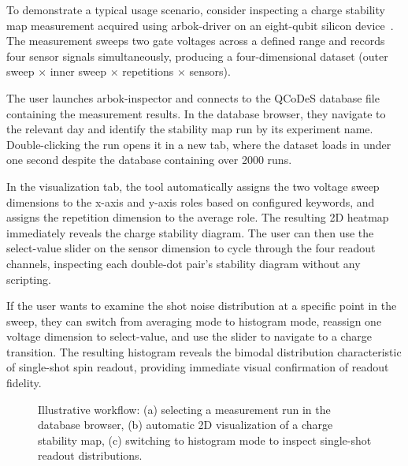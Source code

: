 To demonstrate a typical usage scenario, consider inspecting a charge stability map measurement acquired using arbok-driver on an eight-qubit silicon device~\cite{nickl2025eight}.
The measurement sweeps two gate voltages across a defined range and records four sensor signals simultaneously, producing a four-dimensional dataset (outer sweep $\times$ inner sweep $\times$ repetitions $\times$ sensors).

The user launches arbok-inspector and connects to the QCoDeS database file containing the measurement results.
In the database browser, they navigate to the relevant day and identify the stability map run by its experiment name.
Double-clicking the run opens it in a new tab, where the dataset loads in under one second despite the database containing over 2000 runs.

In the visualization tab, the tool automatically assigns the two voltage sweep dimensions to the x-axis and y-axis roles based on configured keywords, and assigns the repetition dimension to the average role.
The resulting 2D heatmap immediately reveals the charge stability diagram.
The user can then use the select-value slider on the sensor dimension to cycle through the four readout channels, inspecting each double-dot pair's stability diagram without any scripting.

If the user wants to examine the shot noise distribution at a specific point in the sweep, they can switch from averaging mode to histogram mode, reassign one voltage dimension to select-value, and use the slider to navigate to a charge transition.
The resulting histogram reveals the bimodal distribution characteristic of single-shot spin readout, providing immediate visual confirmation of readout fidelity.


\begin{figure}[H]
\caption{Illustrative workflow: (a) selecting a measurement run in the database browser, (b) automatic 2D visualization of a charge stability map, (c) switching to histogram mode to inspect single-shot readout distributions.}
\label{fig:inspector_workflow}
\end{figure}

